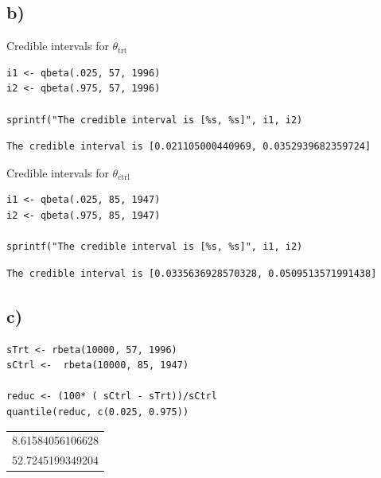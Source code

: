 \documentclass[11pt]{article}
\begin{document}
\subsection*{b)}
\label{sec:org4b1616f}

Credible intervals for \(\theta_{\text{trt}}\)
\begin{verbatim}
i1 <- qbeta(.025, 57, 1996)
i2 <- qbeta(.975, 57, 1996)

sprintf("The credible interval is [%s, %s]", i1, i2)
\end{verbatim}

\begin{verbatim}
The credible interval is [0.021105000440969, 0.0352939682359724]
\end{verbatim}


Credible intervals for \(\theta_{\text{ctrl}}\)
\begin{verbatim}
i1 <- qbeta(.025, 85, 1947)
i2 <- qbeta(.975, 85, 1947)

sprintf("The credible interval is [%s, %s]", i1, i2)
\end{verbatim}

\begin{verbatim}
The credible interval is [0.0335636928570328, 0.0509513571991438]
\end{verbatim}

\subsection*{c)}
\label{sec:org25d6481}

\begin{verbatim}
sTrt <- rbeta(10000, 57, 1996)
sCtrl <-  rbeta(10000, 85, 1947)

reduc <- (100* ( sCtrl - sTrt))/sCtrl
quantile(reduc, c(0.025, 0.975))
\end{verbatim}

\begin{center}
\begin{tabular}{r}
8.61584056106628\\
52.7245199349204\\
\end{tabular}
\end{center}
\end{document}
